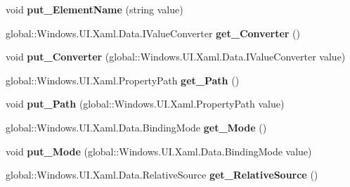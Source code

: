 \begin{DoxyCompactItemize}
void {\bfseries put\+\_\+\+Element\+Name} (string value)
\item 
\mbox{\label{interface_windows_1_1_u_i_1_1_xaml_1_1_data_1_1_i_binding_aeb748478fa74d3af88e1a82f20a682c4}} 
global\+::\+Windows.\+U\+I.\+Xaml.\+Data.\+I\+Value\+Converter {\bfseries get\+\_\+\+Converter} ()
\item 
\mbox{\label{interface_windows_1_1_u_i_1_1_xaml_1_1_data_1_1_i_binding_a6f90eb586d1b47f03de725076ef98329}} 
void {\bfseries put\+\_\+\+Converter} (global\+::\+Windows.\+U\+I.\+Xaml.\+Data.\+I\+Value\+Converter value)
\item 
\mbox{\label{interface_windows_1_1_u_i_1_1_xaml_1_1_data_1_1_i_binding_a9ca632846713b560304c9843f74ed7a8}} 
global\+::\+Windows.\+U\+I.\+Xaml.\+Property\+Path {\bfseries get\+\_\+\+Path} ()
\item 
\mbox{\label{interface_windows_1_1_u_i_1_1_xaml_1_1_data_1_1_i_binding_a196462b99c9682d263adef2e1bbefa09}} 
void {\bfseries put\+\_\+\+Path} (global\+::\+Windows.\+U\+I.\+Xaml.\+Property\+Path value)
\item 
\mbox{\label{interface_windows_1_1_u_i_1_1_xaml_1_1_data_1_1_i_binding_a0b5420b11dcee1ba04cc22736c406538}} 
global\+::\+Windows.\+U\+I.\+Xaml.\+Data.\+Binding\+Mode {\bfseries get\+\_\+\+Mode} ()
\item 
\mbox{\label{interface_windows_1_1_u_i_1_1_xaml_1_1_data_1_1_i_binding_a1677010e1baf985a2a7cb5a399ca34a8}} 
void {\bfseries put\+\_\+\+Mode} (global\+::\+Windows.\+U\+I.\+Xaml.\+Data.\+Binding\+Mode value)
\item 
\mbox{\label{interface_windows_1_1_u_i_1_1_xaml_1_1_data_1_1_i_binding_ae412c463e60fc889a9838767ab62109a}} 
global\+::\+Windows.\+U\+I.\+Xaml.\+Data.\+Relative\+Source {\bfseries get\+\_\+\+Relative\+Source} ()
\item 
\mbox{\label{interface_windows_1_1_u_i_1_1_xaml_1_1_data_1_1_i_binding_ae29a2f22aa4de72a0e7619934ac6e60a}} 

\end{DoxyCompactItemize}
